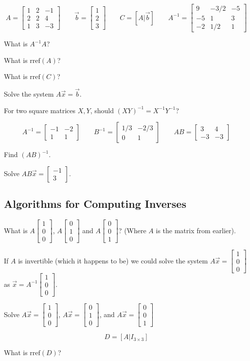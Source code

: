 \documentclass[letter]{article}
\newcommand{\rref}{\mathrm{rref}}
\newcommand{\mat}[1]{\begin{bmatrix}#1\end{bmatrix}}
\begin{document}
	\[
		A=\mat{1&2&-1\\2&2&4\\1&3&-3}\qquad
		\vec b=\mat{1\\2\\3}\qquad
		C=[A|\vec b]\qquad
		A^{-1}=\mat{9&-3/2&-5\\-5&1&3\\-2&1/2&1}
	\]
	\begin{Enum}
		\item What is $A^{-1}A$?
		\item What is $\rref(A)$?
		\item What is $\rref(C)$?
		\item Solve the system $A\vec x=\vec b$.
	\end{Enum}
	\begin{Enum}
		\item For two square matrices $X,Y$, should $(XY)^{-1}=X^{-1}Y^{-1}$?
	\end{Enum}
	\[
		A^{-1}=\mat{-1&-2\\1&1}\qquad B^{-1}=\mat{1/3&-2/3\\0&1}\qquad 
		AB=\mat{3&4\\-3&-3}
	\]
	\begin{Enum}
		\item Find $(AB)^{-1}$.
		\item Solve $AB\vec x=\mat{-1\\3}$.
	\end{Enum}
\subsection*{Algorithms for Computing Inverses}
	\begin{Enum}
		\item What is $A\mat{1\\0\\0}$, $A\mat{0\\1\\0}$
			and $A\mat{0\\0\\1}$? (Where $A$ is the matrix from earlier).
	\end{Enum}
	If $A$ is invertible (which it happens to be) we could solve 
	the system $A\vec x=\mat{1\\0\\0}$ as $\vec x=A^{-1}\mat{1\\0\\0}$.

	\begin{Enum}[resume]
		\item Solve $A\vec x=\mat{1\\0\\0}$,  $A\vec x=\mat{0\\1\\0}$, 
			and $A\vec x=\mat{0\\0\\1}$
	\end{Enum}
	\[
		D=[A|I_{3\times 3}]
	\]
	\begin{Enum}[resume]
	\item What is $\rref(D)$?
	\end{Enum}
\end{document}

